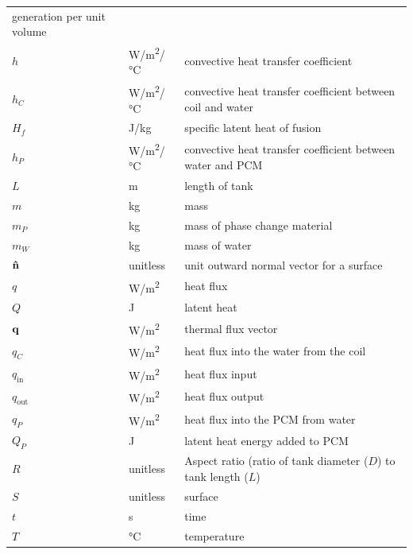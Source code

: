 \documentclass[12pt]{article}
\begin{document}
\begin{longtable*}{l l p{12cm}}
  generation per unit volume
  \\
  $h$ & \si[per-mode=symbol] {\watt\per\square\metre\per\celsius} & convective
  heat transfer coefficient
  \\
  $h_C$ & \si[per-mode=symbol] {\watt\per\square\metre\per\celsius} & convective
  heat transfer coefficient between coil and water
  \\
  $H_f$ & \si[per-mode=symbol] {\joule \per \kilogram} & specific latent heat of
  fusion
  \\
  $h_P$ & \si[per-mode=symbol] {\watt\per\square\metre\per\celsius} & convective
  heat transfer coefficient between water and PCM
  \\
  $L$ & \si{\metre} & length of tank
  \\
  $m$ & \si[per-mode=symbol] {\kilo\gram} & mass
  \\
  $m_P$ & \si[per-mode=symbol] {\kilo\gram} & mass of phase change material
  \\
  $m_W$ & \si[per-mode=symbol] {\kilo\gram} & mass of water
  \\
  $\bf{\hat{n}}$ & \si[per-mode=symbol] {unitless} & unit outward normal vector
  for a surface
  \\
  $q$ & \si[per-mode=symbol] {\watt \per \square \metre} & heat flux
  \\
  $Q$ & \si[per-mode=symbol] {\joule} & latent heat
  \\
  $\bf{q}$ & \si[per-mode=symbol] {\watt\per\square\metre} & thermal flux vector
  \\
  $q_C$ & \si[per-mode=symbol] {\watt\per\square\metre} & heat flux into the water from the coil
  \\
  $q_\text{in}$ & \si[per-mode=symbol] {\watt\per\square\metre} & heat flux input
  \\
  $q_\text{out}$ & \si[per-mode=symbol] {\watt\per\square\metre} & heat flux output
  \\
  $q_P$ & \si[per-mode=symbol] {\watt\per\square\metre} & heat flux into the PCM from water
  \\
  $Q_P$ & \si[per-mode=symbol] {\joule} & latent heat energy added to PCM
  \\
  $R$ & unitless & Aspect ratio (ratio of tank diameter ($D$) to tank length
  ($L$) %
  \\
  $S$ & \si[per-mode=symbol] {unitless} & surface
  \\
  $t$ & \si[per-mode=symbol] {\second} & time
  \\
  $T$ & \si[per-mode=symbol] {\celsius} & temperature

\end{longtable*}
\end{document}
